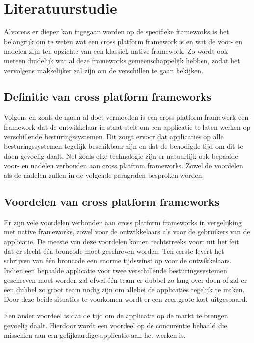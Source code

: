 \section{Literatuurstudie}
\label{sec:literatuurstudie}

Alvorens er dieper kan ingegaan worden op de specifieke frameworks is het belangrijk om te weten wat een cross platform framework is en wat de voor- en nadelen zijn ten opzichte van een klassiek native framework. Zo wordt ook meteen duidelijk wat al deze frameworks gemeenschappelijk hebben, zodat het vervolgens makkelijker zal zijn om de verschillen te gaan bekijken.

\subsection{Definitie van cross platform frameworks}

Volgens \textcite{El-Kassas2014} en zoals de naam al doet vermoeden is een cross platform framework een framework dat de ontwikkelaar in staat stelt om een applicatie te laten werken op verschillende besturingssystemen. Dit zorgt ervoor dat applicaties op alle besturingssystemen tegelijk beschikbaar zijn en dat de benodigde tijd om dit te doen gevoelig daalt. Net zoals elke technologie zijn er natuurlijk ook bepaalde voor- en nadelen verbonden aan cross platfrom frameworks. Zowel de voordelen als de nadelen zullen in de volgende paragrafen besproken worden.

\subsection{Voordelen van cross platform frameworks}

Er zijn vele voordelen verbonden aan cross platform frameworks in vergelijking met native frameworks, zowel voor de ontwikkelaars als voor de gebruikers van de applicatie. De meeste van deze voordelen komen rechtstreeks voort uit het feit dat er slecht één broncode moet geschreven worden. Ten eerste levert het schrijven van één broncode een enorme tijdswinst op voor de ontwikkelaars. Indien een bepaalde applicatie voor twee verschillende besturingssystemen geschreven moet worden zal ofwel één team er dubbel zo lang over doen of zal er een dubbel zo groot team nodig zijn om allebei de applicaties tegelijk te maken. Door deze beide situaties te voorkomen wordt er een zeer grote kost uitgespaard. 

Een ander voordeel is dat de tijd om de applicatie op de markt te brengen gevoelig daalt. Hierdoor wordt een voordeel op de concurentie behaald die misschien aan een gelijkaardige applicatie aan het werken is. 

